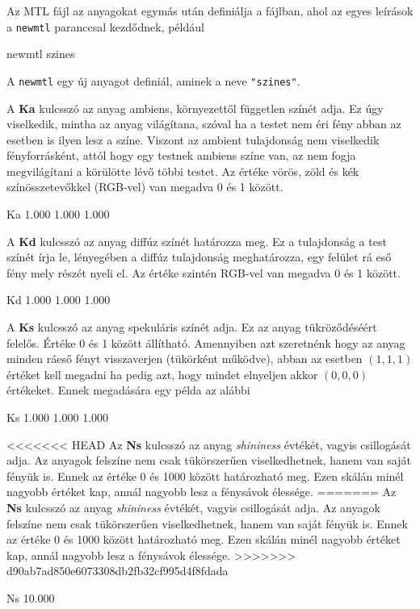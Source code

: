 Az MTL fájl az anyagokat egymás után definiálja a fájlban, ahol az egyes leírások a \texttt{newmtl} paranccsal kezdődnek, például
\begin{python}
newmtl szines
\end{python}
A \texttt{newmtl} egy új anyagot definiál, aminek a neve \texttt{"szines"}.

A \textbf{Ka} kulcsszó az anyag ambiens, környezettől független színét adja. Ez úgy viselkedik, mintha az anyag világítana, szóval ha a testet nem éri fény abban az esetben is ilyen lesz a színe. Viszont  az ambient tulajdonság nem viselkedik fényforrásként, attól hogy egy testnek ambiens színe van, az nem fogja megvilágítani a körülötte lévő többi testet. Az értéke vörös, zöld és kék színösszetevőkkel (RGB-vel) van megadva 0 és 1 között.
\begin{python}
Ka 1.000 1.000 1.000
\end{python}

A \textbf{Kd} kulcsszó az anyag diffúz színét határozza meg. Ez a tulajdonság a test színét írja le, lényegében a diffúz tulajdonság meghatározza, egy felület rá eső fény mely részét nyeli el. Az értéke szintén RGB-vel van megadva 0 és 1 között.
\begin{python}
Kd 1.000 1.000 1.000
\end{python}

A \textbf{Ks} kulcsszó az anyag spekuláris színét adja. Ez az anyag tükröződéséért felelős. Értéke 0 és 1 között állítható. Amennyiben azt szeretnénk hogy az anyag minden ráeső fényt visszaverjen (tükörként működve), abban az esetben $(1, 1, 1)$ értéket kell megadni ha pedig azt, hogy mindet elnyeljen akkor $(0, 0, 0)$ értékeket. Ennek megadására egy példa az alábbi
\begin{python}
Ks 1.000 1.000 1.000
\end{python}

<<<<<<< HEAD
Az \textbf{Ns} kulcsszó az anyag \textit{shininess} évtékét, vagyis csillogását adja. Az anyagok felszíne nem csak tükörszerűen viselkedhetnek, hanem van saját fényük is. Ennek az értéke 0 és 1000 között határozható meg. Ezen skálán minél nagyobb értéket kap, annál nagyobb lesz a fénysávok élessége.\cite{johnmtl}
=======
Az \textbf{Ns} kulcsszó az anyag \textit{shininess} évtékét, vagyis csillogását adja. Az anyagok felszíne nem csak tükörszerűen viselkedhetnek, hanem van saját fényük is. Ennek az értéke 0 és 1000 között határozható meg. Ezen skálán minél nagyobb értéket kap, annál nagyobb lesz a fénysávok élessége.
>>>>>>> d90ab7ad850e6073308db2fb32cf995d4f8fdada
\begin{python}
Ns 10.000
\end{python}

